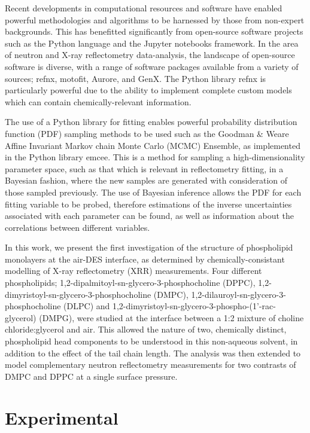 \documentclass[twoside,twocolumn,9pt]{article}
\begin{document}
Recent developments in computational resources and software have enabled powerful methodologies and algorithms to be harnessed by those from non-expert backgrounds. This has benefitted significantly from open-source software projects such as the Python language\cite{vanRossum1995} and the Jupyter notebooks framework.\cite{Kluyver2016} In the area of neutron and X-ray reflectometry data-analysis, the landscape of open-source software is diverse, with a range of software packages available from a variety of sources; refnx\cite{Nelson2018}, motofit,\cite{Nelson2006} Aurore,\cite{Gerelli2016} and GenX.\cite{Bjorck2007} The Python library refnx is particularly powerful due to the ability to implement complete custom models which can contain chemically-relevant information.

The use of a Python library for fitting enables powerful probability distribution function (PDF) sampling methods to be used such as the Goodman \& Weare Affine Invariant Markov chain Monte Carlo (MCMC) Ensemble,\cite{Goodman2010} as implemented in the Python library emcee.\cite{Foreman-Mackey2013} This is a method for sampling a high-dimensionality parameter space, such as that which is relevant in reflectometry fitting, in a Bayesian fashion, where the new samples are generated with consideration of those sampled previously. The use of Bayesian inference allows the PDF for each fitting variable to be probed, therefore estimations of the inverse uncertainties associated with each parameter can be found, as well as information about the correlations between different variables.

In this work, we present the first investigation of the structure of phospholipid monolayers at the air-DES interface, as determined by chemically-consistant modelling of X-ray reflectometry (XRR) measurements. Four different phospholipids; 1,2-dipalmitoyl-sn-glycero-3-phosphocholine (DPPC), 1,2-dimyristoyl-sn-glycero-3-phosphocholine (DMPC),  1,2-dilauroyl-sn-glycero-3-phosphocholine (DLPC) and 1,2-dimyristoyl-sn-glycero-3-phospho-(1'-rac-glycerol) (DMPG), were studied at the interface between a 1:2 mixture of choline chloride:glycerol and air. This allowed the nature of two, chemically distinct, phospholipid head components to be understood in this non-aqueous solvent, in addition to the effect of the tail chain length. The analysis was then extended to model complementary neutron reflectometry measurements for two contrasts of DMPC and DPPC at a single surface pressure.

\section{Experimental}
\end{document}
